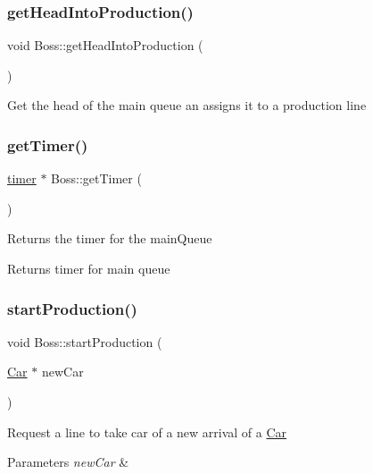 \subsubsection{\texorpdfstring{getHeadIntoProduction()}{getHeadIntoProduction()}}
{\footnotesize\ttfamily void Boss\+::get\+Head\+Into\+Production (\begin{DoxyParamCaption}{ }\end{DoxyParamCaption})}

Get the head of the main queue an assigns it to a production line \mbox{\label{class_boss_a95c7ec846f41a2739929afee235f21c8}} 
\subsubsection{\texorpdfstring{getTimer()}{getTimer()}}
{\footnotesize\ttfamily \mbox{\hyperlink{classtimer}{timer}} $\ast$ Boss\+::get\+Timer (\begin{DoxyParamCaption}{ }\end{DoxyParamCaption})}

Returns the timer for the main\+Queue \begin{DoxyReturn}{Returns}
timer for main queue 
\end{DoxyReturn}
\mbox{\label{class_boss_a9db6a91b8ddacb6258923352a8fb2d8e}} 
\subsubsection{\texorpdfstring{startProduction()}{startProduction()}}
{\footnotesize\ttfamily void Boss\+::start\+Production (\begin{DoxyParamCaption}\item[{\mbox{\hyperlink{class_car}{Car}} $\ast$}]{new\+Car }\end{DoxyParamCaption})}

Request a line to take car of a new arrival of a \mbox{\hyperlink{class_car}{Car}} 
\begin{DoxyParams}{Parameters}
{\em new\+Car} & \\
\hline
\end{DoxyParams}
\mbox{\label{class_boss_a6b221d96706333ee2fe5a2562d6fa94e}} 
